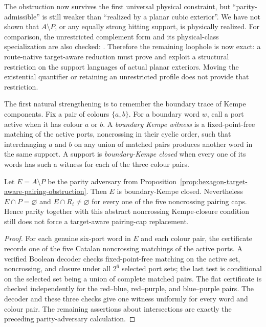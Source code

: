 The obstruction now survives the first universal physical constraint, but
``parity-admissible'' is still weaker than ``realized by a planar cubic
exterior''.  We have not shown that \(A\setminus P\), or any equally strong
hitting support, is physically realized.  For comparison, the unrestricted
complement form and its physical-class specialization are also checked:
.
Therefore the remaining loophole is now exact: a route-native target-aware
reduction must prove and exploit a structural restriction on the support
languages of actual planar exteriors.  Moving the existential quantifier or
retaining an unrestricted profile does not provide that restriction.

The first natural strengthening is to remember the boundary trace of Kempe
components.  Fix a pair of colours \(\{a,b\}\).  For a boundary word \(w\),
call a port active when it has colour \(a\) or \(b\).  A \emph{boundary Kempe
witness} is a fixed-point-free matching of the active ports, noncrossing in
their cyclic order, such that interchanging \(a\) and \(b\) on any union of
matched pairs produces another word in the same support.  A support is
\emph{boundary-Kempe closed} when every one of its words has such a witness
for each of the three colour pairs.

\begin{proposition}
\label{prop:hexagon-boundary-kempe-obstruction}
Let \(E=A\setminus P\) be the parity adversary from
Proposition~\ref{prop:hexagon-target-aware-pairing-obstruction}.  Then \(E\)
is boundary-Kempe closed.  Nevertheless \(E\cap P=\varnothing\) and
\(E\cap R_i\ne\varnothing\) for every one of the five noncrossing pairing
caps.  Hence parity together with this abstract noncrossing Kempe-closure
condition still does not force a target-aware pairing-cap replacement.
\end{proposition}

\begin{proof}
For each genuine six-port word in \(E\) and each colour pair, the certificate
records one of the five Catalan noncrossing matchings of the active ports.  A
verified Boolean decoder checks fixed-point-free matching on the active set,
noncrossing, and closure under all \(2^6\) selected port sets; the last test
is conditional on the selected set being a union of complete matched pairs.
The flat certificate is checked independently for the red--blue,
red--purple, and blue--purple pairs.
The decoder and these three checks give one witness uniformly for every word
and colour pair.
The remaining assertions about intersections are exactly the preceding
parity-adversary calculation.
\end{proof}

